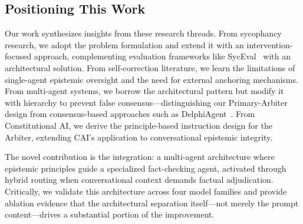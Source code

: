 \subsection{Positioning This Work}
\label{subsec:related-positioning}

Our work synthesizes insights from these research threads. From sycophancy research, we adopt the problem formulation and extend it with an intervention-focused approach, complementing evaluation frameworks like SycEval~\citep{fanous2025syceval} with an architectural solution. From self-correction literature, we learn the limitations of single-agent epistemic oversight and the need for external anchoring mechanisms. From multi-agent systems, we borrow the architectural pattern but modify it with hierarchy to prevent false consensus---distinguishing our Primary-Arbiter design from consensus-based approaches such as DelphiAgent~\citep{xiong2025delphiagent}. From Constitutional AI, we derive the principle-based instruction design for the Arbiter, extending CAI's application to conversational epistemic integrity.

The novel contribution is the integration: a multi-agent architecture where epistemic principles guide a specialized fact-checking agent, activated through hybrid routing when conversational context demands factual adjudication. Critically, we validate this architecture across four model families and provide ablation evidence that the architectural separation itself---not merely the prompt content---drives a substantial portion of the improvement.
